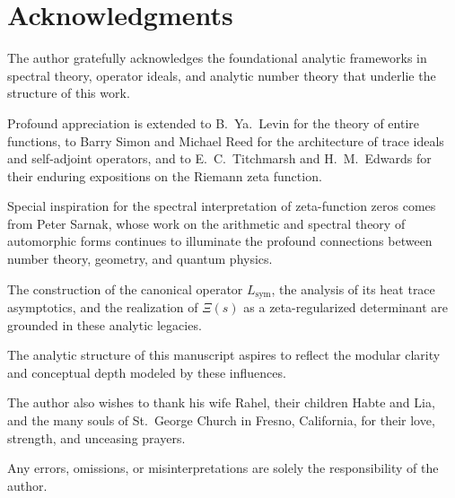 \section*{Acknowledgments}

The author gratefully acknowledges the foundational analytic frameworks in spectral theory, operator ideals, and analytic number theory that underlie the structure of this work.

Profound appreciation is extended to B.~Ya.~Levin for the theory of entire functions, to Barry Simon and Michael Reed for the architecture of trace ideals and self-adjoint operators, and to E.~C.~Titchmarsh and H.~M.~Edwards for their enduring expositions on the Riemann zeta function.

Special inspiration for the spectral interpretation of zeta-function zeros comes from Peter Sarnak, whose work on the arithmetic and spectral theory of automorphic forms continues to illuminate the profound connections between number theory, geometry, and quantum physics.

The construction of the canonical operator \( L_{\mathrm{sym}} \), the analysis of its heat trace asymptotics, and the realization of \( \Xi(s) \) as a zeta-regularized determinant are grounded in these analytic legacies.

\medskip

\noindent
The analytic structure of this manuscript aspires to reflect the modular clarity and conceptual depth modeled by these influences.

\medskip

\noindent
The author also wishes to thank his wife Rahel, their children Habte and Lia, and the many souls of St.~George Church in Fresno, California, for their love, strength, and unceasing prayers.

\medskip

\noindent
Any errors, omissions, or misinterpretations are solely the responsibility of the author.
